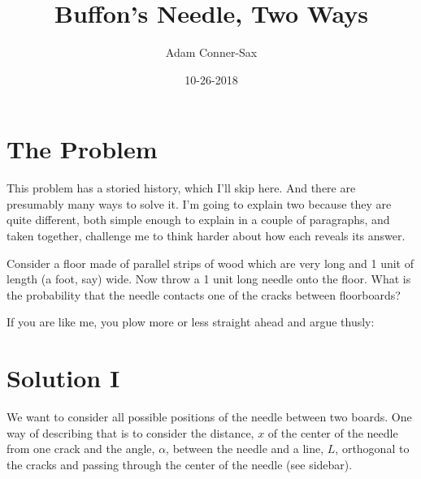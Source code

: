 \documentclass[11pt]{tufte-handout}
\begin{document}
\title{Buffon's Needle, Two Ways}
\author{Adam Conner-Sax}
\date{10-26-2018}
\maketitle

\section{The Problem}
This problem has a storied history, which I'll skip here.  And there are presumably many ways to solve it.  I'm going to explain two because they are quite different, both simple enough to explain in a couple of paragraphs, and taken together, challenge me to think harder about how each reveals its answer.

Consider a floor made of parallel strips of wood which are very long and 1 unit of length (a foot, say) wide.  Now throw a 1 unit long needle onto the floor.  What is the probability that the needle contacts one of the cracks between floorboards?

If you are like me, you plow more or less straight ahead and argue thusly:
\section{Solution I}
We want to consider all possible positions of the needle between two boards.  One way of describing that is to consider the distance, $x$ of the center of the needle from one crack and the angle, $\alpha$, between the needle and a line, $L$, orthogonal to the cracks and passing through the center of the needle (see sidebar).  
\begin{marginfigure}
\end{marginfigure}
\end{document}
